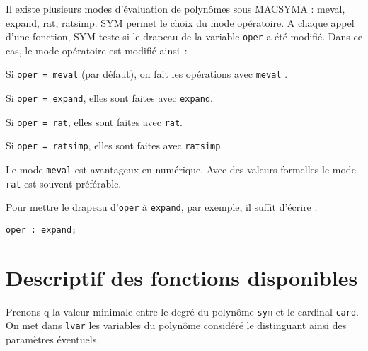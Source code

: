 Il existe plusieurs modes d'\'evaluation de polyn\^omes sous MACSYMA :
meval, expand, rat, ratsimp.
SYM permet le choix du mode op\'eratoire.
A chaque appel d'une fonction, SYM teste si le drapeau de la variable {\tt oper}
a \'et\'e modifi\'e. Dans ce cas, le mode op\'eratoire est modifi\'e ainsi~:
\begin{description}
\item Si {\tt oper = meval} (par d\'efaut), on fait
      les op\'erations avec {\tt meval} .
\item Si {\tt oper = expand}, elles sont faites avec {\tt expand}.
      
\item Si {\tt oper = rat}, elles sont faites avec {\tt rat}.
\item Si {\tt oper = ratsimp}, elles sont faites avec {\tt ratsimp}.

\end{description}
Le mode {\tt meval} est avantageux en num\'erique. Avec des valeurs
formelles le mode {\tt rat} est souvent pr\'ef\'erable.

Pour mettre le drapeau d'{\tt oper} \`a {\tt expand}, par exemple, il
suffit d'\'ecrire :
\begin{center}
{\tt oper : expand;}
\end{center}
\section{Descriptif des fonctions disponibles}

Prenons q la valeur minimale entre le degr\'{e} du polyn\^ome {\tt sym}
 et le cardinal {\tt card}.
On met dans {\tt lvar} les variables du polyn\^ome consid\'er\'e le
distinguant ainsi des param\`etres \'eventuels.

